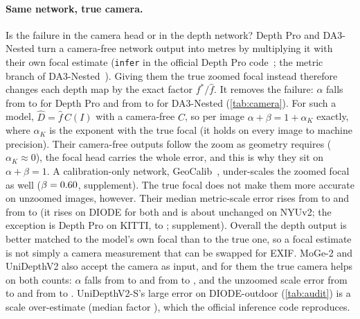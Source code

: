 \paragraph{Same network, true camera.}
Is the failure in the camera head or in the depth network? Depth Pro and DA3-Nested turn a camera-free
network output into metres by multiplying it with their own focal estimate (\texttt{infer} in the official
Depth Pro code~\cite{bochkovskii2025depthpro}; the metric branch of DA3-Nested~\cite{lin2025da3}). Giving them
the true zoomed focal instead therefore changes each depth map by the exact factor $f^{*}/\hat f$. It removes the failure: $\alpha$ falls from \DepthproCamOwnAlpha{} to \DepthproCamGivenAlpha{} for
Depth Pro and from \DaThreeNestedCamOwnAlpha{} to \DaThreeNestedCamGivenAlpha{} for DA3-Nested
(\cref{tab:camera}). For such a model, $\hat D=\hat f\,C(I)$ with a camera-free $C$, so per image
$\alpha+\beta=1+\alpha_{K}$ exactly, where $\alpha_{K}$ is the exponent with the true focal (it holds on every
image to machine precision). Their camera-free outputs follow the zoom as geometry requires ($\alpha_{K}\approx0$),
the focal head carries the whole error, and this is why they sit on $\alpha+\beta=1$. A calibration-only network, GeoCalib~\cite{veicht2024geocalib}, under-scales the zoomed focal as
well ($\beta=0.60$, supplement). The true focal does not make
them more accurate on unzoomed images, however. Their median metric-scale error rises from
\DepthproCamOwnScale{} to \DepthproCamGivenScale{} and from \DaThreeNestedCamOwnScale{} to
\DaThreeNestedCamGivenScale{} (it rises on DIODE for both and is about unchanged on NYUv2; the exception is Depth Pro on KITTI,
\DepthproCamOwnScaleKitti{} to \DepthproCamGivenScaleKitti; supplement). Overall the depth output is better matched to the model's own focal than to the true
one, so a focal estimate is not simply a camera measurement that can be swapped for EXIF. MoGe-2 and
UniDepthV2 also accept the camera as input, and for them the true camera helps on both counts: $\alpha$ falls
from \MogeTwoSCamOwnAlpha{} to \MogeTwoSCamGivenAlpha{} and from \UnidepthTwoSCamOwnAlpha{} to
\UnidepthTwoSCamGivenAlpha, and the unzoomed scale error from \MogeTwoSCamOwnScale{} to \MogeTwoSCamGivenScale{}
and from \UnidepthTwoSCamOwnScale{} to \UnidepthTwoSCamGivenScale. UniDepthV2-S's large error on DIODE-outdoor
(\cref{tab:audit}) is a scale over-estimate (median factor \udDiodeOutScale), which the official inference code
reproduces.


